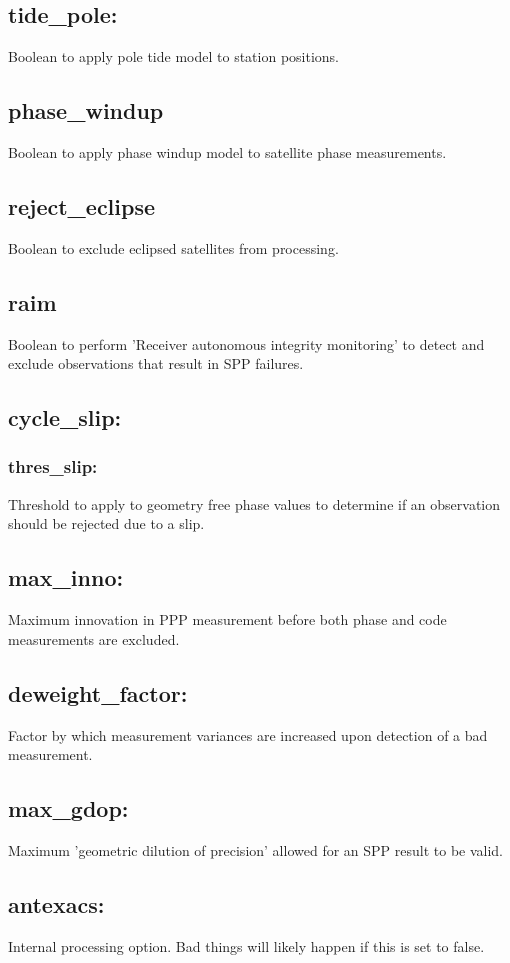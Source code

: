 \subsection{tide\_pole:}
Boolean to apply pole tide model to station positions.
\subsection{phase\_windup}
Boolean to apply phase windup model to satellite phase measurements.
\subsection{reject\_eclipse}
Boolean to exclude eclipsed satellites from processing.
\subsection{raim}
Boolean to perform 'Receiver autonomous integrity monitoring' to detect and exclude observations that result in SPP failures.
\subsection{cycle\_slip:}
\subsubsection{thres\_slip:}
Threshold to apply to geometry free phase values to determine if an observation should be rejected due to a slip.
\subsection{max\_inno:}
Maximum innovation in PPP measurement before both phase and code measurements are excluded.
\subsection{deweight\_factor:}
Factor by which measurement variances are increased upon detection of a bad measurement.
\subsection{max\_gdop:}
Maximum 'geometric dilution of precision' allowed for an SPP result to be valid.
\subsection{antexacs:}
Internal processing option. Bad things will likely happen if this is set to false.
